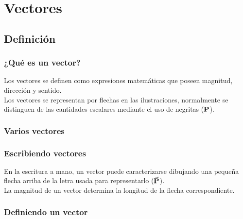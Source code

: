\documentclass[12pt]{beamer}
\begin{document}
\section{Vectores}
\subsection{Definición}

\begin{frame}
\frametitle{¿Qué es un vector?}
Los vectores se definen como expresiones matemáticas que poseen magnitud, dirección y sentido.
\\
\bigskip
\pause
Los vectores se representan por flechas en las ilustraciones, normalmente se distinguen de las cantidades escalares mediante el uso de negritas ($\vb{P}$).
\end{frame}
\begin{frame}
\frametitle{Varios vectores}
\begin{figure}
    \centering
\end{figure}
\end{frame}
\begin{frame}
\frametitle{Escribiendo vectores}
En la escritura a mano, un vector puede caracterizarse dibujando una pequeña flecha arriba de la letra usada para representarlo ($\va{P}$).
\\
\bigskip
\pause
La magnitud de un vector determina la longitud de la flecha correspondiente.
\end{frame}
\begin{frame}
\frametitle{Definiendo un vector}
\begin{figure}
    \centering
\end{figure}
\end{frame}
\end{document}
